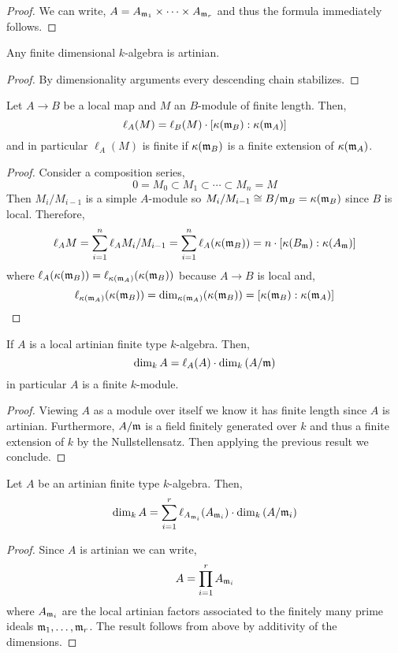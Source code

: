 \documentclass[12pt]{article}
\begin{document}
\begin{proof}
We can write, $A = A_{\mathfrak{m}_1} \times \cdots \times A_{\mathfrak{m}_r}$ and thus the formula immediately follows.
\end{proof}


\begin{prop}
Any finite dimensional $k$-algebra is artinian.
\end{prop}

\begin{proof}
By dimensionality arguments every descending chain stabilizes. 
\end{proof}

\begin{prop}
Let $A \to B$ be a local map and $M$ an $B$-module of finite length. Then,
\[ \ell_A(M) = \ell_B(M) \cdot [ \kappa(\mathfrak{m}_B) : \kappa(\mathfrak{m}_A) ] \]
and in particular $\ell_A(M)$ is finite if $\kappa(\mathfrak{m}_B)$ is a finite extension of $\kappa(\mathfrak{m}_A)$.
\end{prop}

\begin{proof}
Consider a composition series,
\[ 0 = M_0 \subset M_{1} \subset \cdots \subset M_n = M \]
Then $M_i / M_{i - 1}$ is a simple $A$-module so $M_i / M_{i-1} \cong B / \mathfrak{m}_B = \kappa(\mathfrak{m}_B)$ since $B$ is local. Therefore,
\[ \ell_A{M} = \sum_{i = 1}^n \ell_A{M_i / M_{i-1}} = \sum_{i = 1}^n \ell_A(\kappa(\mathfrak{m}_B)) = n \cdot [ \kappa(B_{\mathfrak{m}}) : \kappa(A_{\mathfrak{m}}) ] \]
where $\ell_A(\kappa(\mathfrak{m}_B)) = \ell_{\kappa(\mathfrak{m}_A)}(\kappa(\mathfrak{m}_B))$ because $A \to B$ is local and,
\[ \ell_{\kappa(\mathfrak{m}_A)}(\kappa(\mathfrak{m}_B)) = \dim_{\kappa(\mathfrak{m}_A)}(\kappa(\mathfrak{m}_B)) = [\kappa(\mathfrak{m}_B) : \kappa(\mathfrak{m}_A)] \]
\end{proof}

\begin{cor}
If $A$ is a local artinian finite type $k$-algebra. Then,
\[ \dim_k{A} = \ell_A(A) \cdot \dim_k{(A / \mathfrak{m})} \]
in particular $A$ is a finite $k$-module. 
\end{cor}

\begin{proof}
Viewing $A$ as a module over itself we know it has finite length since $A$ is artinian. Furthermore, $A / \mathfrak{m}$ is a field finitely generated over $k$ and thus a finite extension of $k$ by the Nullstellensatz. Then applying the previous result we conclude. 
\end{proof}

\begin{cor}
Let $A$ be an artinian finite type $k$-algebra. Then,
\[ \dim_k{A} = \sum_{i = 1}^r \ell_{A_{\mathfrak{m}_i}}(A_{\mathfrak{m}_i}) \cdot \dim_k{(A / \mathfrak{m}_i)} \]
\end{cor}

\begin{proof}
Since $A$ is artinian we can write,
\[ A = \prod_{i = 1}^r A_{\mathfrak{m}_i} \]
where $A_{\mathfrak{m}_i}$ are the local artinian factors associated to the finitely many prime ideals $\mathfrak{m}_1, \dots, \mathfrak{m}_r$. The result follows from above by additivity of the dimensions.
\end{proof}
\end{document}
